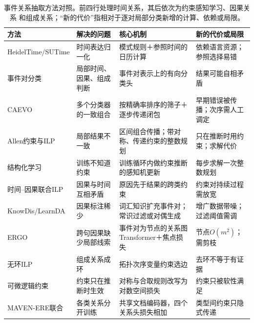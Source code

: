 \begin{table}[htbp]
  \centering
  \small
  \begin{tabularx}{\linewidth}{@{}>{\raggedright\arraybackslash}p{24mm} XXX@{}}
    \toprule
    方法 & 解决的问题 & 核心机制 & 新的代价或局限\\
    \midrule
    HeidelTime\slash SUTime & 时间表达归一化 & 模式规则＋参照时间的日历计算 & 依赖语言资源；参照选择易错 \\
    事件对分类 & 局部时间、因果、组成判断 & 事件对表示上的有向分类头 & 结果可能自相矛盾 \\
    CAEVO & 多个分类器的一致组合 & 按精确率排序的筛子＋逐步传递闭包 & 早期错误被传播；次序需人工调定 \\
    Allen约束与ILP & 局部结果不一致 & 区间组合传播；带对称、传递约束的整数规划 & 只在推断时用约束；求解代价 \\
    结构化学习 & 训练不知道约束 & 训练循环内做约束推断的感知机更新 & 每步求解一次整数规划 \\
    时间--因果联合ILP & 因果与时间互相矛盾 & 原因先于结果的跨类约束 & 约束对持续过程需放宽 \\
    KnowDis\slash LearnDA & 因果标注稀少 & 词汇知识扩充事件对；常识过滤或对偶生成 & 增广数据带噪；过滤阈值需调 \\
    ERGO & 跨句因果缺少局部线索 & 事件对为节点的关系图Transformer＋焦点损失 & 节点$O(m^2)$；需剪枝 \\
    无环ILP & 组成关系成环 & 拓扑次序变量约束选边 & 去环不等于有证据 \\
    可微逻辑约束 & 约束只在推断时生效 & 对称与合取规则改写为对数空间损失 & 约束只被软性满足 \\
    MAVEN-ERE联合 & 各类关系分开训练 & 共享文档编码器，四个关系头损失相加 & 类型间约束只隐式传递 \\
    \bottomrule
  \end{tabularx}
  \caption{事件关系抽取方法对照。前四行处理时间关系，其后依次为约束感知学习、因果关系
  和组成关系；“新的代价”指相对于逐对局部分类新增的计算、依赖或局限。}
  \label{tab:nlp-extraction-event-relation-methods}
\end{table}
